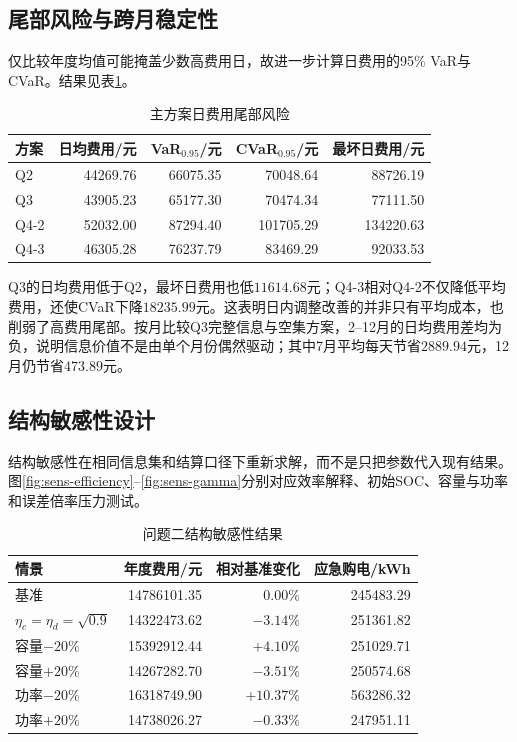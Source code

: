 \documentclass[UTF8,12pt,a4paper]{ctexart}
\theoremstyle{remark}
\begin{document}
\subsection{尾部风险与跨月稳定性}
仅比较年度均值可能掩盖少数高费用日，故进一步计算日费用的95\% VaR与CVaR。结果见表\ref{tab:tail-risk}。
\begin{table}[H]\centering\small
\caption{主方案日费用尾部风险}\label{tab:tail-risk}
\begin{tabular}{lrrrr}\toprule
方案&日均费用/元&VaR$_{0.95}$/元&CVaR$_{0.95}$/元&最坏日费用/元\\\midrule
Q2&44269.76&66075.35&70048.64&88726.19\\
Q3&43905.23&65177.30&70474.34&77111.50\\
Q4-2&52032.00&87294.40&101705.29&134220.63\\
Q4-3&46305.28&76237.79&83469.29&92033.53\\\bottomrule
\end{tabular}\end{table}
Q3的日均费用低于Q2，最坏日费用也低$11614.68$元；Q4-3相对Q4-2不仅降低平均费用，还使CVaR下降$18235.99$元。这表明日内调整改善的并非只有平均成本，也削弱了高费用尾部。按月比较Q3完整信息与空集方案，2--12月的日均费用差均为负，说明信息价值不是由单个月份偶然驱动；其中7月平均每天节省$2889.94$元，12月仍节省$473.89$元。

\subsection{结构敏感性设计}
结构敏感性在相同信息集和结算口径下重新求解，而不是只把参数代入现有结果。图\ref{fig:sens-efficiency}--\ref{fig:sens-gamma}分别对应效率解释、初始SOC、容量与功率和误差倍率压力测试。
\begin{table}[H]\centering\small
\caption{问题二结构敏感性结果}\label{tab:structure-sensitivity}
\begin{tabular}{lrrr}\toprule
情景&年度费用/元&相对基准变化&应急购电/kWh\\\midrule
基准&14786101.35&0.00\%&245483.29\\
$\eta_c=\eta_d=\sqrt{0.9}$&14322473.62&$-3.14\%$&251361.82\\
容量$-20\%$&15392912.44&$+4.10\%$&251029.71\\
容量$+20\%$&14267282.70&$-3.51\%$&250574.68\\
功率$-20\%$&16318749.90&$+10.37\%$&563286.32\\
功率$+20\%$&14738026.27&$-0.33\%$&247951.11\\\bottomrule
\end{tabular}\end{table}
\end{document}
